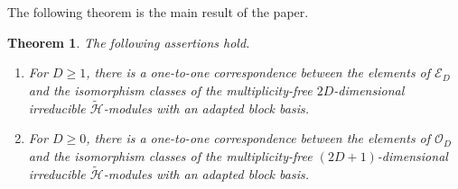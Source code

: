 \documentclass[reqno]{amsart}
\newtheorem{theorem}{Theorem}[section]
\theoremstyle{definition}
\begin{document}
The following theorem is the main result of the paper.


\begin{theorem}\label{thm:main}
%
The following assertions hold.
\begin{enumerate}
\item[\rm (i)]
For $D\geq 1$, there is a one-to-one correspondence between the elements of
$\mathcal{E}_D$ and the isomorphism classes of the multiplicity-free
$2D$-dimensional irreducible $\widetilde{\mathcal{H}}$-modules
with an adapted block basis.

\item[\rm (ii)]
For $D\geq 0$, there is a one-to-one correspondence between the elements of
$\mathcal{O}_D$ and the isomorphism classes of the multiplicity-free
$(2D+1)$-dimensional irreducible $\widetilde{\mathcal{H}}$-modules
with an adapted block basis.
\end{enumerate}
%
\end{theorem}
\end{document}
